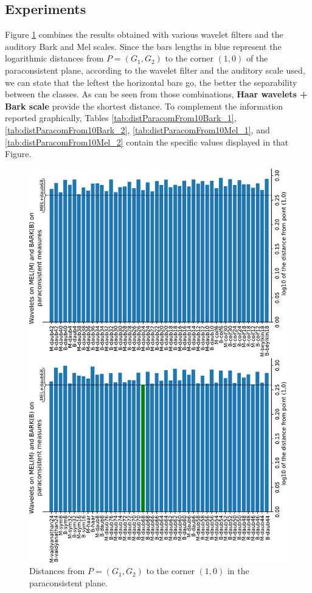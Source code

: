 \subsection{Experiments}
	\par Figure \ref{fig:paraconsistentfull} combines the results obtained with various wavelet filters and the auditory Bark and Mel scales. Since the bars lengths in blue represent the logarithmic distances from $P=(G_1,G_2)$ to the corner $(1,0)$ of the paraconsistent plane, according to the wavelet filter and the auditory scale used, we can state that the leftest the horizontal bars go, the better the separability between the classes. As can be seen from those combinations, \textbf{Haar wavelets + Bark scale} provide the shortest distance. To complement the information reported graphically, Tables \ref{tab:distParacomFrom10Bark_1}, \ref{tab:distParacomFrom10Bark_2}, \ref{tab:distParacomFrom10Mel_1}, and \ref{tab:distParacomFrom10Mel_2} contain the specific values displayed in that Figure.
	\\
	\begin{figure}[H]
		\centering
		\includegraphics[angle=-90,scale=.62]{images/results/paraconsistentPlane/ParaconsistentFull.pdf}
		\caption{Distances from $P=(G_1,G_2)$ to the corner $(1,0)$ in the paraconsistent plane.}
		\label{fig:paraconsistentfull}
	\end{figure}
